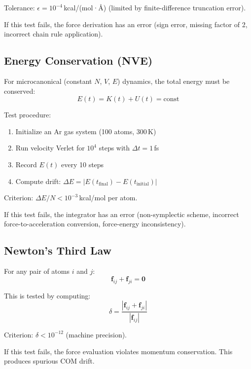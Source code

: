 \documentclass[11pt]{article}
\begin{document}
Tolerance: $\epsilon = 10^{-4}$\,kcal/(mol·\AA) (limited by finite-difference truncation error).

If this test fails, the force derivation has an error (sign error, missing factor of 2, incorrect chain rule application).

\subsection{Energy Conservation (NVE)}

For microcanonical (constant $N$, $V$, $E$) dynamics, the total energy must be conserved:
\begin{equation}
E(t) = K(t) + U(t) = \text{const}
\end{equation}

Test procedure:
\begin{enumerate}
\item Initialize an Ar gas system (100 atoms, 300\,K)
\item Run velocity Verlet for $10^4$ steps with $\Delta t = 1$\,fs
\item Record $E(t)$ every 10 steps
\item Compute drift: $\Delta E = |E(t_{\text{final}}) - E(t_{\text{initial}})|$
\end{enumerate}

Criterion: $\Delta E / N < 10^{-3}$\,kcal/mol per atom.

If this test fails, the integrator has an error (non-symplectic scheme, incorrect force-to-acceleration conversion, force-energy inconsistency).

\subsection{Newton's Third Law}

For any pair of atoms $i$ and $j$:
\begin{equation}
\mathbf{f}_{ij} + \mathbf{f}_{ji} = \mathbf{0}
\end{equation}

This is tested by computing:
\begin{equation}
\delta = \frac{|\mathbf{f}_{ij} + \mathbf{f}_{ji}|}{|\mathbf{f}_{ij}|}
\end{equation}

Criterion: $\delta < 10^{-12}$ (machine precision).

If this test fails, the force evaluation violates momentum conservation. This produces spurious COM drift.
\end{document}
